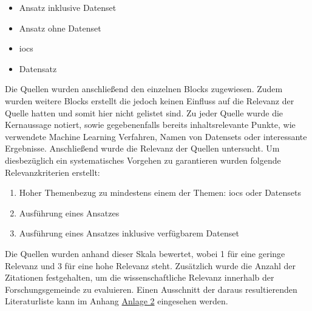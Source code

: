 \documentclass[
    12pt, %
    DIV10,
    ngerman, %
    a4paper, %
    oneside, %
    titlepage, %
    parskip=half, %
    headings=normal, %
    listof=totoc, %
    bibliography=totoc, %
    index=totoc, %
    captions=tableheading, %
    final %
]{scrreprt}
\begin{document}
\begin{itemize}
\item Ansatz inklusive Datenset
\item Ansatz ohne Datenset
\item \ac{iocs}
\item Datensatz
\end{itemize}
Die Quellen wurden anschlie{\ss}end den einzelnen Blocks zugewiesen. Zudem wurden weitere Blocks erstellt die jedoch keinen Einfluss auf die Relevanz der Quelle hatten und somit hier nicht gelistet sind. Zu jeder Quelle wurde die Kernaussage notiert, sowie gegebenenfalls bereits inhaltsrelevante Punkte, wie verwendete Machine Learning Verfahren, Namen von Datensets oder interessante Ergebnisse. Anschlie{\ss}end wurde die Relevanz der Quellen untersucht. 
Um diesbezüglich ein systematisches Vorgehen zu garantieren wurden folgende Relevanzkriterien erstellt:
\begin{enumerate}
\item Hoher Themenbezug zu mindestens einem der Themen: \ac{iocs} oder Datensets
\item Ausführung eines Ansatzes
\item Ausführung eines Ansatzes inklusive verfügbarem Datenset
\end{enumerate}
Die Quellen wurden anhand dieser Skala bewertet, wobei 1 für eine geringe Relevanz und 3 für eine hohe Relevanz steht.
Zusätzlich wurde die Anzahl der Zitationen festgehalten, um die wissenschaftliche Relevanz innerhalb der Forschungsgemeinde zu evaluieren. Einen Ausschnitt der daraus resultierenden Literaturliste kann im Anhang \hyperref[literaturr]{Anlage 2} eingesehen werden.
\end{document}
